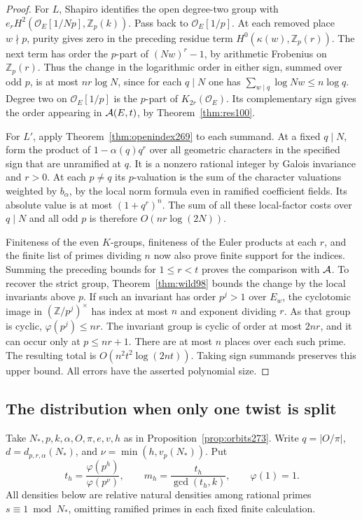 \documentclass[a4paper,11pt]{article}
\theoremstyle{definition}
\theoremstyle{remark}
\numberwithin{equation}{section}
\begin{document}
\begin{proof}
For \(L\), Shapiro identifies the open degree-two group
with \(e_rH^2(\mathcal O_E[1/Np],\mathbb Z_p(k))\).
Pass back to \(\mathcal O_E[1/p]\). At each removed place
\(w\nmid p\), purity gives zero in the preceding residue
term \(H^0(\kappa(w),\mathbb Z_p(r))\). The next term has
order the \(p\)-part of \((Nw)^r-1\), by arithmetic
Frobenius on \(\mathbb Z_p(r)\). Thus the change in the
logarithmic order in either sign, summed over odd \(p\),
is at most \(nr\log N\), since for each \(q\mid N\) one has
\(\sum_{w\mid q}\log Nw\le n\log q\).
Degree two on \(\mathcal O_E[1/p]\) is the \(p\)-part of
\(K_{2r}(\mathcal O_E)\). Its complementary sign gives the
order appearing in \({\cal A}(E,t)\), by
Theorem~\ref{thm:res100}.

For \(L'\), apply Theorem~\ref{thm:openindex269} to each
summand. At a fixed \(q\mid N\), form the product of
\(1-\alpha(q)q^r\) over all geometric characters in the
specified sign that are unramified at \(q\). It is a nonzero
rational integer by Galois invariance and \(r>0\).
At each \(p\ne q\) its \(p\)-valuation is the sum of the
character valuations weighted by \(b_\alpha\), by the local
norm formula even in ramified coefficient fields. Its
absolute value is at most \((1+q^r)^n\).
The sum of all these local-factor costs over \(q\mid N\)
and all odd \(p\) is therefore \(O(nr\log(2N))\).

Finiteness of the even \(K\)-groups, finiteness of the Euler
products at each \(r\), and the finite list of primes dividing
\(n\) now also prove finite support for the indices. Summing
the preceding bounds for \(1\le r<t\) proves the comparison
with \({\cal A}\).
To recover the strict group, Theorem~\ref{thm:wild98} bounds
the change by the local invariants above \(p\). If such an
invariant has order \(p^j>1\) over \(E_w\), the cyclotomic
image in \((\mathbb Z/p^j)^\times\) has index at most \(n\)
and exponent dividing \(r\). As that group is cyclic,
\(\varphi(p^j)\le nr\). The invariant group is cyclic of
order at most \(2nr\), and it can occur only at \(p\le nr+1\).
There are at most \(n\) places over each such prime.
The resulting total is \(O(n^2t^2\log(2nt))\).
Taking sign summands preserves this upper bound. All errors
have the asserted polynomial size.
\end{proof}

\subsection{The distribution when only one twist is split}\label{nav:IV-43}
Take \(N_*,p,k,\alpha,O,\pi,e,v,h\) as in
Proposition~\ref{prop:orbits273}. Write \(q=|O/\pi|\),
\(d=d_{p,r,\alpha}(N_*)\), and \(\nu=\min(h,v_p(N_*))\).
Put
\[
       t_h=\frac{\varphi(p^h)}{\varphi(p^\nu)},\qquad
       m_h=\frac{t_h}{\gcd(t_h,k)},\qquad\varphi(1)=1 .
\]
All densities below are relative natural densities among rational
primes \(s\equiv1\bmod N_*\), omitting ramified primes in each
fixed finite calculation.
\end{document}
